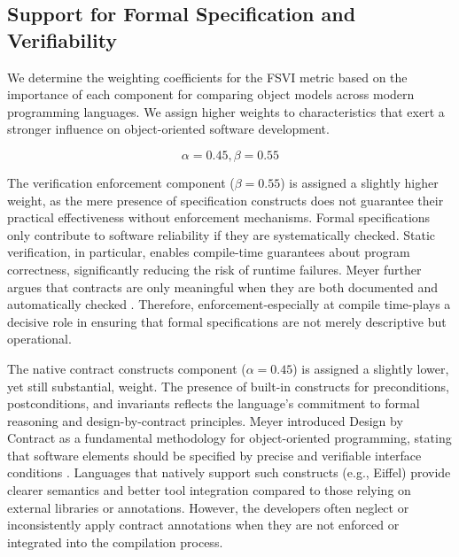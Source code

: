\subsection{Support for Formal Specification and Verifiability}

We determine the weighting coefficients for the FSVI metric based on the importance of each component for comparing object models across modern programming languages. We assign higher weights to characteristics that exert a stronger influence on object-oriented software development.

\[
\alpha = 0.45, \beta = 0.55
\]

The verification enforcement component ($\beta = 0.55$) is assigned a slightly higher weight, as the mere presence of specification constructs does not guarantee their practical effectiveness without enforcement mechanisms. Formal specifications only contribute to software reliability if they are systematically checked. Static verification, in particular, enables compile-time guarantees about program correctness, significantly reducing the risk of runtime failures. Meyer further argues that contracts are only meaningful when they are both documented and automatically checked \cite{meyer2002applying}. Therefore, enforcement-especially at compile time-plays a decisive role in ensuring that formal specifications are not merely descriptive but operational.

The native contract constructs component ($\alpha = 0.45$) is assigned a slightly lower, yet still substantial, weight. The presence of built-in constructs for preconditions, postconditions, and invariants reflects the language’s commitment to formal reasoning and design-by-contract principles. Meyer introduced Design by Contract as a fundamental methodology for object-oriented programming, stating that software elements should be specified by precise and verifiable interface conditions \cite{meyer1997object}. Languages that natively support such constructs (e.g., Eiffel) provide clearer semantics and better tool integration compared to those relying on external libraries or annotations. However, the developers often neglect or inconsistently apply contract annotations when they are not enforced or integrated into the compilation process. 
